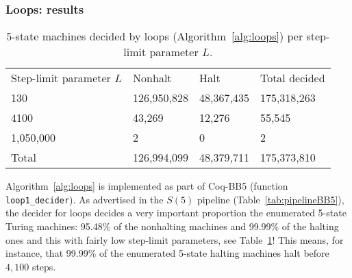\subsubsection{Loops: results}\label{sec:loops:results}

\begin{table}[h!]
  \centering
  \begin{tabular}{llll}
    Step-limit parameter $L$ & Nonhalt                         & Halt                           & Total decided \\
    130                      & 126,950,828                     & 48,367,435                     & 175,318,263   \\
    4100                     & 43,269                          & 12,276                         & 55,545        \\
    1,050,000                & 2                               & 0                              & 2             \\ \hline
    Total                    & \multicolumn{1}{r}{126,994,099} & \multicolumn{1}{r}{48,379,711} & 175,373,810
  \end{tabular}
  \caption{5-state machines decided by loops (Algorithm~\ref{alg:loops}) per step-limit parameter $L$.}\label{tab:paramsLoops}
\end{table}

Algorithm~\ref{alg:loops} is implemented as part of Coq-BB5 (function \texttt{loop1\_decider}). As advertised in the $S(5)$ pipeline (Table~\ref{tab:pipelineBB5}), the decider for loops decides a very important proportion the enumerated 5-state Turing machines: 95.48\% of the nonhalting machines and 99.99\% of the halting ones and this with fairly low step-limit parameters, see Table~\ref{tab:paramsLoops}! This means, for instance, that 99.99\% of the enumerated 5-state halting machines halt before $4,100$ steps.